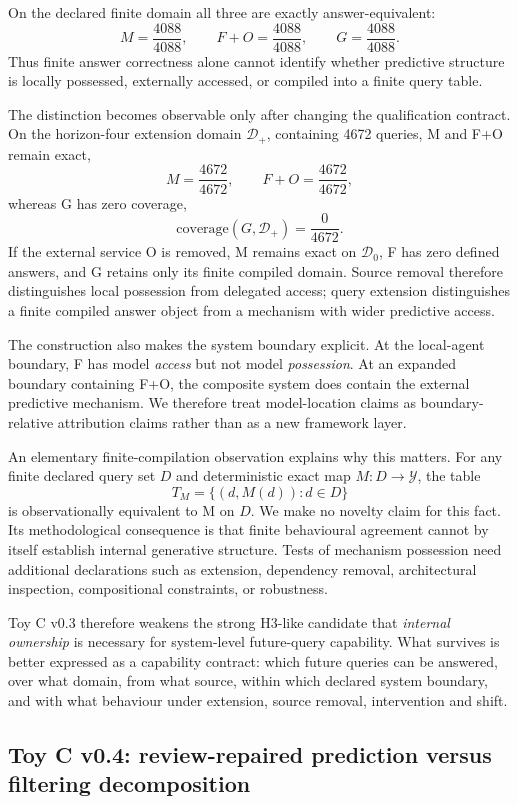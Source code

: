 \documentclass[10pt]{article}
\begin{document}
On the declared finite domain all three are exactly answer-equivalent:
\[
M=\frac{4088}{4088},
\qquad
F+O=\frac{4088}{4088},
\qquad
G=\frac{4088}{4088}.
\]
Thus finite answer correctness alone cannot identify whether predictive structure is locally possessed, externally accessed, or compiled into a finite query table.

The distinction becomes observable only after changing the qualification contract. On the horizon-four extension domain $\mathcal D_+$, containing 4672 queries, M and F+O remain exact,
\[
M=\frac{4672}{4672},
\qquad
F+O=\frac{4672}{4672},
\]
whereas G has zero coverage,
\[
\mathrm{coverage}(G,\mathcal D_+)=\frac{0}{4672}.
\]
If the external service O is removed, M remains exact on $\mathcal D_0$, F has zero defined answers, and G retains only its finite compiled domain. Source removal therefore distinguishes local possession from delegated access; query extension distinguishes a finite compiled answer object from a mechanism with wider predictive access.

The construction also makes the system boundary explicit. At the local-agent boundary, F has model \emph{access} but not model \emph{possession}. At an expanded boundary containing F+O, the composite system does contain the external predictive mechanism. We therefore treat model-location claims as boundary-relative attribution claims rather than as a new framework layer.

An elementary finite-compilation observation explains why this matters. For any finite declared query set $D$ and deterministic exact map $M:D\to\mathcal Y$, the table
\[
T_M=\{(d,M(d)):d\in D\}
\]
is observationally equivalent to M on $D$. We make no novelty claim for this fact. Its methodological consequence is that finite behavioural agreement cannot by itself establish internal generative structure. Tests of mechanism possession need additional declarations such as extension, dependency removal, architectural inspection, compositional constraints, or robustness.

Toy C v0.3 therefore weakens the strong H3-like candidate that \emph{internal ownership} is necessary for system-level future-query capability. What survives is better expressed as a capability contract: which future queries can be answered, over what domain, from what source, within which declared system boundary, and with what behaviour under extension, source removal, intervention and shift.



\subsection{Toy C v0.4: review-repaired prediction versus filtering decomposition}
\end{document}
